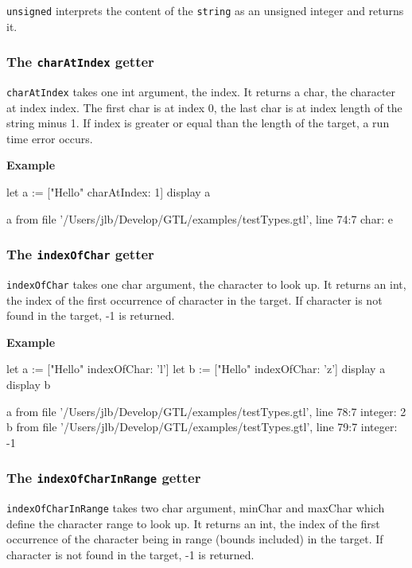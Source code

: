 \documentclass[10pt,openright,twosides,final]{memoir}
\newcommand{\icst}[1]{{\footnotesize\ttfamily\colorbox{light-blue}{#1}}}
\newcommand{\gtlarg}[1]{{\footnotesize\ttfamily\colorbox{light-blue}{#1}}}
\newcommand{\gtlinline}[1]{\colorbox{light-blue}{\lstinline[language=gtl]{#1}}}
\newcommand{\example}{\vspace{.75em}\noindent\textbf{Example}\vspace{0em}}
\begin{document}
\gtlinline{unsigned} interprets the content of the \gtlinline{string} as an unsigned integer and returns it. 

\subsubsection{The \texttt{charAtIndex} getter}

\gtlinline{charAtIndex} takes one int argument, the \gtlarg{index}. It returns a char, the character at index \gtlarg{index}. The first char is at index 0, the last char is at index length of the string minus 1. If \gtlarg{index} is greater or equal than the length of the target, a run time error occurs.

\example
\begin{gtl}
let a := ["Hello" charAtIndex: 1]
display a
\end{gtl}
\begin{console}
a from file '/Users/jlb/Develop/GTL/examples/testTypes.gtl', line 74:7
    char: e
\end{console}


\subsubsection{The \texttt{indexOfChar} getter}

\gtlinline{indexOfChar} takes one char argument, the \gtlarg{character} to look up. It returns an int, the index of the first occurrence of \gtlarg{character} in the target. If \gtlarg{character} is not found in the target, \icst{-1} is returned.

\example
\begin{gtl}
let a := ["Hello" indexOfChar: 'l']
let b := ["Hello" indexOfChar: 'z']
display a
display b
\end{gtl}
\begin{console}
a from file '/Users/jlb/Develop/GTL/examples/testTypes.gtl', line 78:7
    integer: 2
b from file '/Users/jlb/Develop/GTL/examples/testTypes.gtl', line 79:7
    integer: -1
\end{console}

\subsubsection{The \texttt{indexOfCharInRange} getter}

\gtlinline{indexOfCharInRange} takes two char argument, \gtlarg{minChar} and \gtlarg{maxChar} which define the character range to look up. It returns an int, the index of the first occurrence of the character being in range (bounds included) in the target. If \gtlarg{character} is not found in the target, \icst{-1} is returned.
\end{document}
